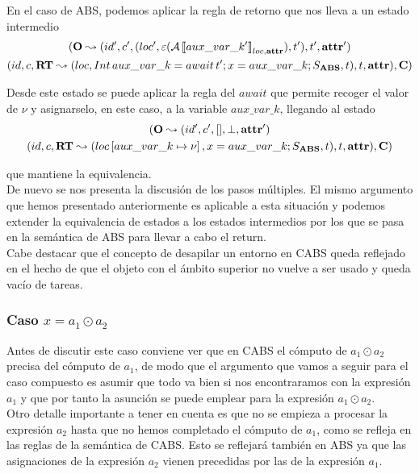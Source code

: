 En el caso de ABS, podemos aplicar la regla de retorno que nos lleva a un estado intermedio
\begin{multline*}
  (\mathbf{O} \leadsto (id', c', (loc', \varepsilon(\mathcal{A} \left\llbracket aux\_var\_k' \right\rrbracket_{loc, \textbf{attr}}), t'), t', \textbf{attr}')\\
  (id, c, \textbf{RT} \leadsto (loc, Int\, aux\_var\_k = await\,t'\mbox{;\,} x = aux\_var\_k\mbox{;\,} S_{\textbf{ABS}}, t), t, \textbf{attr}), \mathbf{C})
\end{multline*}

Desde este estado se puede aplicar la regla del $await$ que permite recoger el valor de $\nu$ y asignarselo, en este caso, a la variable $aux\_var\_k$, llegando al estado
\begin{multline*}
  (\mathbf{O} \leadsto (id', c', [], \perp, \textbf{attr}')\\
  (id, c, \textbf{RT} \leadsto (loc\left[ aux\_var\_k\mapsto\nu \right], x = aux\_var\_k\mbox{;\,} S_{\textbf{ABS}}, t), t, \textbf{attr}), \mathbf{C})
\end{multline*}

que mantiene la equivalencia.\\

De nuevo se nos presenta la discusión de los pasos múltiples. El mismo argumento que hemos presentado anteriormente es aplicable a esta situación y podemos extender la equivalencia de estados a los estados intermedios por los que se pasa en la semántica de ABS para llevar a cabo el return.\\

Cabe destacar que el concepto de desapilar un entorno en CABS queda reflejado en el hecho de que el objeto con el ámbito superior no vuelve a ser usado y queda vacío de tareas.

\subsubsection{Caso $x = a_1 \odot a_2$}

Antes de discutir este caso conviene ver que en CABS el cómputo de $a_1 \odot a_2$ precisa del cómputo de $a_1$, de modo que el argumento que vamos a seguir para el caso compuesto es asumir que todo va bien si nos encontraramos con la expresión $a_1$ y que por tanto la asunción se puede emplear para la expresión $a_1 \odot a_2$.\\

Otro detalle importante a tener en cuenta es que no se empieza a procesar la expresión $a_2$ hasta que no hemos completado el cómputo de $a_1$, como se refleja en las reglas de la semántica de CABS. Esto se reflejará también en ABS ya que las asignaciones de la expresión $a_2$ vienen precedidas por las de la expresión $a_1$.\\


